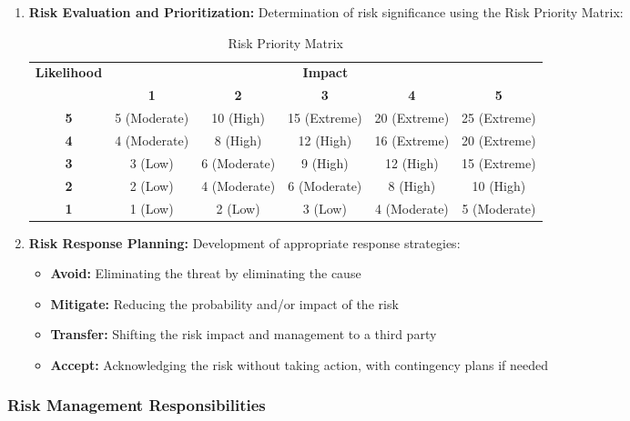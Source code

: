 \begin{enumerate}
    \item \textbf{Risk Evaluation and Prioritization:} Determination of risk significance using the Risk Priority Matrix:
    
    \begin{table}[h]
    \centering
    \begin{tabular}{|c|c|c|c|c|c|}
    \hline
    \multirow{2}{*}{\textbf{Likelihood}} & \multicolumn{5}{c|}{\textbf{Impact}} \\
    \cline{2-6}
    & \textbf{1} & \textbf{2} & \textbf{3} & \textbf{4} & \textbf{5} \\
    \hline
    \textbf{5} & 5 (Moderate) & 10 (High) & 15 (Extreme) & 20 (Extreme) & 25 (Extreme) \\
    \hline
    \textbf{4} & 4 (Moderate) & 8 (High) & 12 (High) & 16 (Extreme) & 20 (Extreme) \\
    \hline
    \textbf{3} & 3 (Low) & 6 (Moderate) & 9 (High) & 12 (High) & 15 (Extreme) \\
    \hline
    \textbf{2} & 2 (Low) & 4 (Moderate) & 6 (Moderate) & 8 (High) & 10 (High) \\
    \hline
    \textbf{1} & 1 (Low) & 2 (Low) & 3 (Low) & 4 (Moderate) & 5 (Moderate) \\
    \hline
    \end{tabular}
    \caption{Risk Priority Matrix}
    \end{table}
    
    \item \textbf{Risk Response Planning:} Development of appropriate response strategies:
    \begin{itemize}
        \item \textbf{Avoid:} Eliminating the threat by eliminating the cause
        \item \textbf{Mitigate:} Reducing the probability and/or impact of the risk
        \item \textbf{Transfer:} Shifting the risk impact and management to a third party
        \item \textbf{Accept:} Acknowledging the risk without taking action, with contingency plans if needed
    \end{itemize}
\end{enumerate}

\subsubsection{Risk Management Responsibilities} \label{sec:risk_responsibilities}

